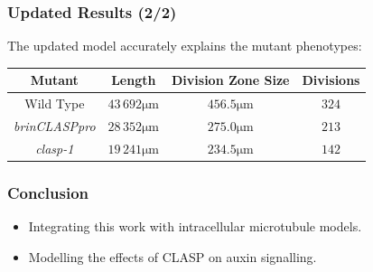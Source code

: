 \documentclass{beamer}
\newcommand{\um}{\unit{\micro\metre}}
\begin{document}
\begin{frame}
\frametitle{Updated Results (2/2)}
The updated model accurately explains the mutant phenotypes:
\begin{center}
\medskip
\begin{tabular}{|c c c c |} 
 \hline
 Mutant & Length & Division Zone Size & Divisions  \\ [0.5ex] 
 \hline
 Wild Type & $43\,692\um$ &  $456.5\um$ & $324$ \\ 
 \hline
 \emph{brinCLASPpro} & $28\,352\um$ &  $275.0\um$ & $213$ \\
 \hline
 \emph{clasp-1} & $19\,241\um$ &  $234.5\um$ & $142$ \\
 \hline
\end{tabular}
\end{center}
\end{frame}

\begin{frame}
\frametitle{Conclusion}


\bigskip

\begin{itemize}
 \item<2-> Integrating this work with intracellular microtubule models.
 \item<2-> Modelling the effects of CLASP on auxin signalling.
\end{itemize}

\bigskip


\end{frame}
\end{document}
